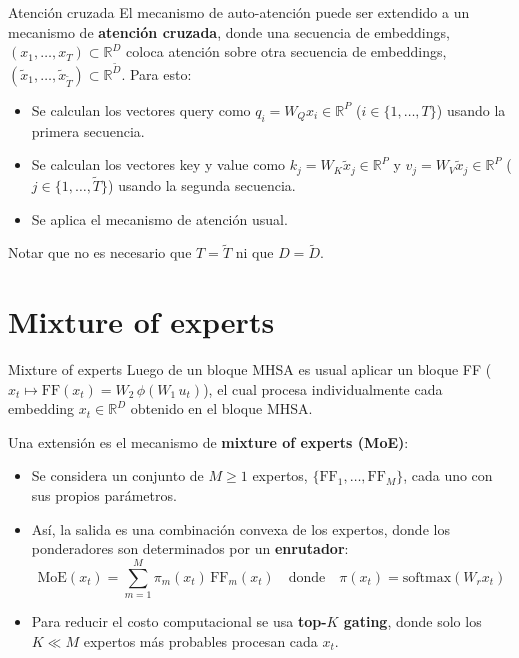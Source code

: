 \documentclass{beamer}
\newcommand{\R}{\mathbb{R}}
\begin{document}
\begin{frame}{Atención cruzada}
    El mecanismo de auto-atención puede ser extendido a un mecanismo de \textbf{atención cruzada}, donde una secuencia de embeddings, $(x_1,\ldots,x_{ T})\subset \R^D$ coloca atención sobre otra secuencia de embeddings, $(\tilde x_1,\ldots,\tilde x_{\tilde T})\subset \R^{\tilde D}$. Para esto:
    \begin{itemize}
        \item Se calculan los vectores query como $q_i=W_Q x_i\in\R^P$ ($i\in\{1,\ldots,T\}$) usando la primera secuencia.
        \item Se calculan los vectores key y value como $k_j=W_K \tilde x_j\in\R^P$ y $v_j=W_V \tilde x_j\in\R^P$ ($j\in\{1,\ldots,\tilde T\}$) usando la segunda secuencia.
        \item Se aplica el mecanismo de atención usual.
    \end{itemize}
    Notar que no es necesario que $T=\tilde T$ ni que $D=\tilde D$.
\end{frame}

\section{Mixture of experts}

\begin{frame}{Mixture of experts}
    Luego de un bloque MHSA es usual aplicar un bloque FF ($x_t\mapsto\text{FF}(x_t)=W_2\,\phi\left(W_1\,u_t\right)$), el cual procesa individualmente cada embedding $x_t\in\R^D$ obtenido en el bloque MHSA.

    Una extensión es el mecanismo de \textbf{mixture of experts (MoE)}:
    \begin{itemize}
        \item Se considera un conjunto de $M\geq 1$ expertos, $\{\text{FF}_1,\ldots,\text{FF}_M\}$, cada uno con sus propios parámetros.
        \item Así, la salida es una combinación convexa de los expertos, donde los ponderadores son determinados por un \textbf{enrutador}:
              \begin{equation*}
                  \text{MoE}(x_t) = \sum_{m=1}^M \pi_m(x_t)\,\text{FF}_m(x_t)
                  \quad\text{donde}\quad
                  \pi(x_t)=\text{softmax}(W_r x_t)
              \end{equation*}
        \item Para reducir el costo computacional se usa \textbf{top-$K$ gating}, donde solo los $K\ll M$ expertos más probables procesan cada $x_t$.
    \end{itemize}
\end{frame}
\end{document}
